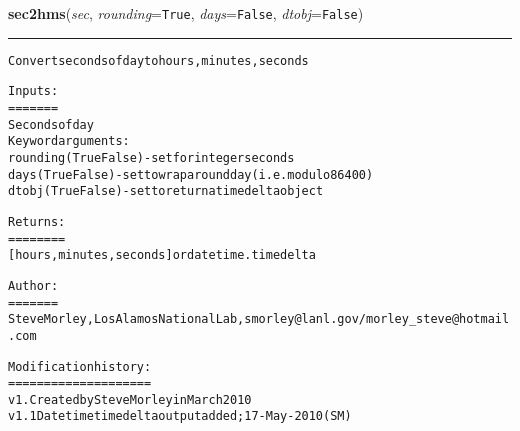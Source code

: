     \label{spacepy:toolbox:sec2hms}

    \vspace{0.5ex}

\hspace{.8\funcindent}\begin{boxedminipage}{\funcwidth}

    \raggedright \textbf{sec2hms}(\textit{sec}, \textit{rounding}={\tt True}, \textit{days}={\tt False}, \textit{dtobj}={\tt False})

    \vspace{-1.5ex}

    \rule{\textwidth}{0.5\fboxrule}
\setlength{\parskip}{2ex}
\begin{alltt}
Convert seconds of day to hours, minutes, seconds

Inputs:
=======
Seconds of day
Keyword arguments:
    rounding (True{\textbar}False) - set for integer seconds
    days (True{\textbar}False) - set to wrap around day (i.e. modulo 86400)
    dtobj (True{\textbar}False) - set to return a timedelta object

Returns:
========
[hours, minutes, seconds] or datetime.timedelta

Author:
=======
Steve Morley, Los Alamos National Lab, smorley@lanl.gov/morley\_steve@hotmail.com

Modification history:
====================
v1. Created by Steve Morley in March 2010
v1.1 Datetime timedelta output added; 17-May-2010 (SM)
\end{alltt}

\setlength{\parskip}{1ex}
    \end{boxedminipage}

    \label{spacepy:toolbox:tOverlap}

    \vspace{0.5ex}

